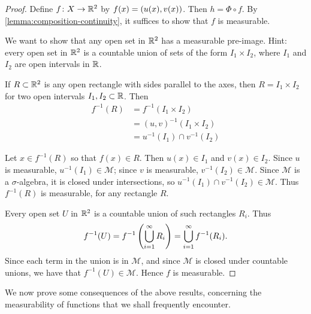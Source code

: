 \begin{proof}
Define $f\colon X\to\mathbb R^2$ by $f(x)=\left(u(x),v(x)\right)$. Then $h=\Phi\circ f$. By \ref{lemma:composition-continuity}, it suffices to show that $f$ is measurable.

\begin{idea}
We want to show that any open set in $\mathbb R^2$ has a measurable pre-image. 
Hint: every open set in $\mathbb R^2$ is a countable union of sets of the form $I_1\times I_2$, where $I_1$ and $I_2$ are open intervals in $\mathbb R$.
\end{idea}

If $R\subset\mathbb R^2$ is any open rectangle with sides parallel to the axes, then $R=I_1\times I_2$ for two open intervals $I_1,I_2\subset\mathbb R$. Then
\begin{align*}
f^{-1}(R)
&=f^{-1}(I_1\times I_2)\\
&=(u,v)^{-1}(I_1\times I_2)\\
&=u^{-1}(I_1)\cap v^{-1}(I_2)
\end{align*}

Let $x\in f^{-1}(R)$ so that $f(x)\in R$. Then $u(x)\in I_1$ and $v(x)\in I_2$. Since $u$ is measurable, $u^{-1}(I_1)\in\mathcal{M}$; since $v$ is measurable, $v^{-1}(I_2)\in\mathcal{M}$. 
Since $\mathcal{M}$ is a $\sigma$-algebra, it is closed under intersections, so $u^{-1}(I_1)\cap v^{-1}(I_2)\in\mathcal{M}$. Thus $f^{-1}(R)$ is measurable, for any rectangle $R$.

Every open set $U$ in $\mathbb R^2$ is a countable union of such rectangles $R_i$. Thus
\[f^{-1}(U)=f^{-1}\left(\bigcup_{i=1}^{\infty}R_i\right)=\bigcup_{i=1}^{\infty}f^{-1}(R_i).\]
Since each term in the union is in $\mathcal{M}$, and since $\mathcal{M}$ is closed under countable unions, we have that $f^{-1}(U)\in\mathcal{M}$.
Hence $f$ is measurable.
\end{proof}

We now prove some consequences of the above results, concerning the measurability of functions that we shall frequently encounter.

